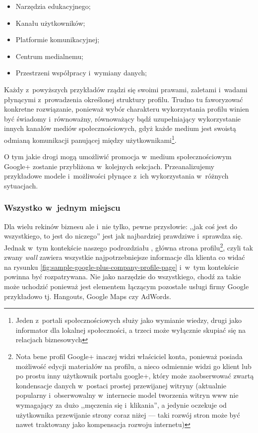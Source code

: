 \begin{itemize}
\item Narzędzia edukacyjnego;
\item Kanału użytkowników;
\item Platformie komunikacyjnej;
\item Centrum medialnemu;
\item Przestrzeni współpracy i~wymiany danych;
\end{itemize}

Każdy z~powyższych przykładów rządzi się swoimi prawami, zaletami i~wadami płynącymi z~prowadzenia określonej struktury profilu. Trudno tu faworyzować konkretne rozwiązanie, ponieważ wybór charakteru wykorzystania profilu winien być świadomy i~równoważny, równoważący bądź uzupełniający wykorzystanie innych kanałów mediów społecznościowych, gdyż każde medium jest swoistą odmianą komunikacji panującej między użytkownikami\footnote{Jeden  z~portali społecznościowych służy jako wymianie wiedzy, drugi jako informator dla lokalnej społeczności, a trzeci może wyłącznie skupiać się na relacjach biznesowych}.

O tym jakie drogi mogą umożliwić promocja w~medium społecznościowym \mbox{Google+} zostanie przybliżona w~kolejnych sekcjach. Przeanalizujemy przykładowe modele i~możliwości płynące z~ich wykorzystania w~różnych sytuacjach.


\subsubsection{\nmu Wszystko w~jednym miejscu}
\label{subsubsec:wszystko-w-jednym-miejscu}
Dla wielu rekinów biznesu ale i~nie tylko, pewne przysłowie: ,,jak coś jest  do wszystkiego, to jest do niczego'' jest jak najbardziej prawdziwe i~sprawdza się. Jednak w~tym kontekście naszego podrozdziału , główna strona profilu\footnote{Nota bene profil Google+ inaczej widzi właściciel konta, ponieważ posiada możliwość edycji materiałów na profilu, a nieco odmiennie widzi go klient lub po prostu inny użytkownik portalu google+, który może zaobserwować zwartą kondensacje danych w~postaci prostej przewijanej witryny (aktualnie popularny i~obserwowalny w~internecie model tworzenia witryn www nie wymagający za dużo ,,męczenia się i~klikania'', a jedynie oczekuje od użytkownika przewijanie strony coraz niżej --- taki rozwój stron może być nawet traktowany jako kompensacja rozwoju internetu)}, czyli tak zwany \textit{wall} zawiera wszystkie najpotrzebniejsze informacje dla klienta co widać na rysunku \ref{fig:sample-google-plus-company-profile-page} i~w~tym kontekście powinna być rozpatrywana. Nie jako narzędzie do wszystkiego, chodź za takie może uchodzić ponieważ jest elementem łączącym pozostałe usługi firmy Google przykładowo tj. Hangouts, Google Maps czy AdWords. 

